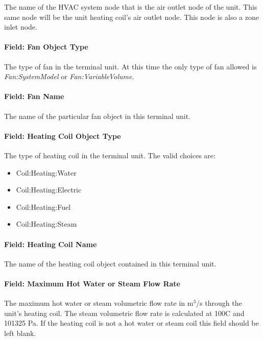 The name of the HVAC system node that is the air outlet node of the unit. This same node will be the unit heating coil's air outlet node. This node is also a zone inlet node.

\paragraph{Field: Fan Object Type}\label{field-fan-object-type}

The type of fan in the terminal unit. At this time the only type of fan allowed is \emph{Fan:SystemModel} or \emph{Fan:VariableVolume}.

\paragraph{Field: Fan Name}\label{field-fan-name}

The name of the particular fan object in this terminal unit.

\paragraph{Field: Heating Coil Object Type}\label{field-heating-coil-object-type}

The type of heating coil in the terminal unit. The valid choices are:

\begin{itemize}
\item
  Coil:Heating:Water
\item
  Coil:Heating:Electric
\item
  Coil:Heating:Fuel
\item
  Coil:Heating:Steam
\end{itemize}

\paragraph{Field: Heating Coil Name}\label{field-heating-coil-name}

The name of the heating coil object contained in this terminal unit.

\paragraph{Field: Maximum Hot Water or Steam Flow Rate}\label{field-maximum-hot-water-or-steam-flow-rate-2}

The maximum hot water or steam volumetric flow rate in m\(^{3}\)/s through the unit's heating coil. The steam volumetric flow rate is calculated at 100C and 101325 Pa. If the heating coil is not a hot water or steam coil this field should be left blank.

